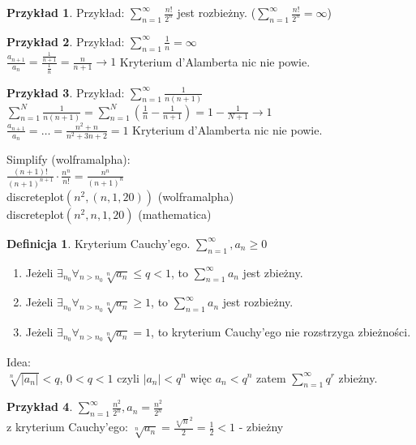 \documentclass{article}
\theoremstyle{definition}
\newtheorem{de}{Definicja}[subsection]
\theoremstyle{definition}
\theoremstyle{definition}
\newtheorem{pk}{Przykład}[subsection]
\theoremstyle{definition}
\begin{document}
\begin{pk}
    Przykład: $\sum_{n=1}^{\infty} \frac{n!}{2^n}$ jest rozbieżny. ($\sum_{n=1}^{\infty} \frac{n!}{2^n}=\infty$)
\end{pk}

\begin{pk}
    Przykład:
    $\sum_{n=1}^{\infty} \frac{1}{n} = \infty$\\
    $\frac{a_{n+1}}{a_n} = \frac{\frac{1}{n+1}}{\frac{1}{n}}=\frac{n}{n+1}\rightarrow 1$ Kryterium d'Alamberta nic nie powie.
\end{pk}

\begin{pk}
    Przykład: $\sum_{n=1}^{\infty} \frac{1}{n(n+1)}$\\
    $\sum_{n=1}^{N} \frac{1}{n(n+1)} = \sum_{n=1}^{N} (\frac{1}{n}-\frac{1}{n+1})=1-\frac{1}{N+1}\rightarrow 1$\\
    $\frac{a_{n+1}}{a_n} = \dots = \frac{n^2+n}{n^2+3n+2}=1$ Kryterium d'Alamberta nic nie powie.
\end{pk}

Simplify (wolframalpha):\\
$\frac{(n+1)!}{(n+1)^{n+1}}\cdot\frac{n^n}{n!}=\frac{n^n}{(n+1)^n}$\\

discreteplot$(n^2,(n,1,20))$ (wolframalpha)\\

discreteplot$(n^2,{n,1,20})$ (mathematica)

\begin{de}
    Kryterium Cauchy'ego. $\sum_{n=1}^{\infty}, a_n\geq 0$
    \begin{enumerate}
        \item Jeżeli $\exists_{n_0}\forall_{n>n_0} \sqrt[n]{a_n} \leq q < 1$, to $\sum_{n=1}^{\infty} a_n$ jest zbieżny.
        \item Jeżeli $\exists_{n_0}\forall_{n>n_0} \sqrt[n]{a_n} \geq 1$, to $\sum_{n=1}^{\infty} a_n$ jest rozbieżny.
        \item Jeżeli $\exists_{n_0}\forall_{n>n_0} \sqrt[n]{a_n} = 1$, to kryterium Cauchy'ego nie rozstrzyga zbieżności.
    \end{enumerate}
    Idea:\\
    $\sqrt[n]{|a_n|}<q$, $0<q<1$ czyli
    $|a_n|<q^n$ więc
    $a_n<q^n$ zatem
    $\sum_{n=1}^{\infty} q^r$ zbieżny.
\end{de}

\begin{pk}
    $\sum_{n=1}^{\infty} \frac{n^2}{2^n}, a_n=\frac{n^2}{2^n}$\\
    z kryterium Cauchy'ego: $\sqrt[n]{a_n} = \frac{\sqrt[n]{n}^2}{2} = \frac{1}{2} < 1$ - zbieżny
\end{pk}
\end{document}
